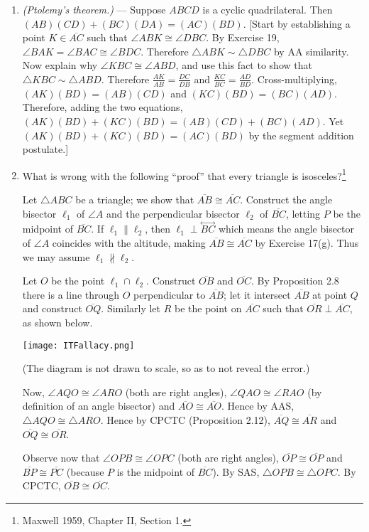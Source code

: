 \documentclass[leqno]{book}
\begin{document}
\begin{enumerate}
\item\emph{(Ptolemy's theorem.)} \---- Suppose $ABCD$ is a cyclic quadrilateral.  Then $(AB)(CD)+(BC)(DA)=(AC)(BD)$.  [Start by establishing a point $K\in\overline{AC}$ such that $\angle ABK\cong\angle DBC$.  By Exercise 19, $\angle BAK=\angle BAC\cong\angle BDC$.  Therefore $\triangle ABK\sim\triangle DBC$ by AA similarity.  Now explain why $\angle KBC\cong\angle ABD$, and use this fact to show that $\triangle KBC\sim\triangle ABD$.  Therefore $\frac{AK}{AB}=\frac{DC}{DB}$ and $\frac{KC}{BC}=\frac{AD}{BD}$.  Cross-multiplying, $(AK)(BD)=(AB)(CD)$ and $(KC)(BD)=(BC)(AD)$.  Therefore, adding the two equations, $(AK)(BD)+(KC)(BD)=(AB)(CD)+(BC)(AD)$.  Yet $(AK)(BD)+(KC)(BD)=(AC)(BD)$ by the segment addition postulate.] %

\item What is wrong with the following ``proof'' that every triangle is isosceles?\footnote{Maxwell 1959, Chapter II, Section 1.}

Let $\triangle ABC$ be a triangle; we show that $\overline{AB}\cong\overline{AC}$.  Construct the angle bisector $\ell_1$ of $\angle A$ and the perpendicular bisector $\ell_2$ of $\overline{BC}$, letting $P$ be the midpoint of $\overline{BC}$.  If $\ell_1\parallel\ell_2$, then $\ell_1\perp\overset{\longleftrightarrow}{BC}$ which means the angle bisector of $\angle A$ coincides with the altitude, making $\overline{AB}\cong\overline{AC}$ by Exercise 17(g).
Thus we may assume $\ell_1\not\parallel\ell_2$.

Let $O$ be the point $\ell_1\cap\ell_2$.  Construct $\overline{OB}$ and $\overline{OC}$.  By Proposition 2.8 there is a line through $O$ perpendicular to $\overline{AB}$; let it intersect $\overline{AB}$ at point $Q$ and construct $\overline{OQ}$.  Similarly let $R$ be the point on $\overline{AC}$ such that $\overline{OR}\perp\overline{AC}$, as shown below.
\begin{center}\texttt{[image: ITFallacy.png]}\end{center}
(The diagram is not drawn to scale, so as to not reveal the error.)

Now, $\angle AQO\cong\angle ARO$ (both are right angles), $\angle QAO\cong\angle RAO$ (by definition of an angle bisector) and $\overline{AO}\cong\overline{AO}$.  Hence by AAS, $\triangle AQO\cong\triangle ARO$.  Hence by CPCTC (Proposition 2.12), $\overline{AQ}\cong\overline{AR}$ and $\overline{OQ}\cong\overline{OR}$.

Observe now that $\angle OPB\cong\angle OPC$ (both are right angles), $\overline{OP}\cong\overline{OP}$ and $\overline{BP}\cong\overline{PC}$ (because $P$ is the midpoint of $\overline{BC}$).  By SAS, $\triangle OPB\cong\triangle OPC$.  By CPCTC, $\overline{OB}\cong\overline{OC}$.


\end{enumerate}
\end{document}
